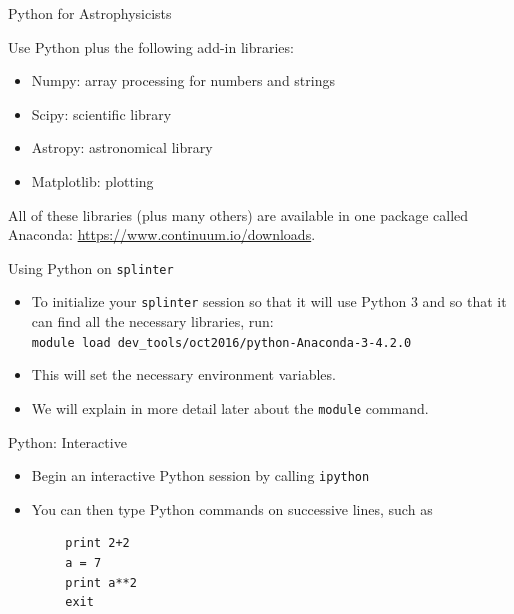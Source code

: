 \documentclass{beamer}
\begin{document}
\begin{frame}{Python for Astrophysicists}
  \begin{block}{Use Python plus the following add-in libraries:}
    \begin{itemize}
      \item Numpy: array processing for numbers and strings
      \item Scipy: scientific library
      \item Astropy: astronomical library
      \item Matplotlib: plotting
    \end{itemize}
  \end{block}
  \begin{block}{All of these libraries (plus many others) are available in one package called Anaconda:}
    \url{https://www.continuum.io/downloads}.
  \end{block}
\end{frame}

\begin{frame}{Using Python on \texttt{splinter}}
  \begin{itemize}
    \item To initialize your \texttt{splinter} session so that it will use Python 3 and so that it can find all the necessary libraries, run: \\
    \alert{\texttt{module~load~dev\_tools/oct2016/python-Anaconda-3-4.2.0}}
    \item This will set the necessary environment variables.
    \item We will explain in more detail later about the \texttt{module} command.
  \end{itemize}
\end{frame}

\begin{frame}[fragile]{Python: Interactive}
  \begin{itemize}
    \item Begin an interactive Python session by calling \alert{\texttt{ipython}}
    \item You can then type Python commands on successive lines, such as
  \end{itemize}
  \begin{lstlisting}
        print 2+2
        a = 7
        print a**2
        exit
  \end{lstlisting}
\end{frame}
\end{document}

